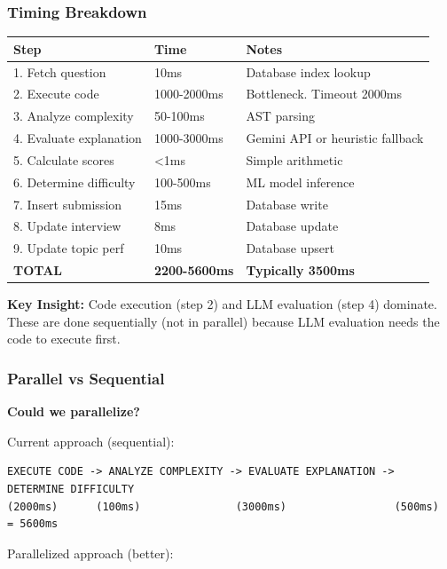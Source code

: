 \documentclass[12pt,a4paper,oneside]{article}
\begin{document}
\subsubsection{Timing Breakdown}

\begin{table}[H]
\centering
\begin{tabular}{|p{2.5cm}|p{2cm}|p{7.5cm}|}
\hline
\textbf{Step} & \textbf{Time} & \textbf{Notes} \\
\hline
1. Fetch question & 10ms & Database index lookup \\
\hline
2. Execute code & 1000-2000ms & Bottleneck. Timeout 2000ms \\
\hline
3. Analyze complexity & 50-100ms & AST parsing \\
\hline
4. Evaluate explanation & 1000-3000ms & Gemini API or heuristic fallback \\
\hline
5. Calculate scores & <1ms & Simple arithmetic \\
\hline
6. Determine difficulty & 100-500ms & ML model inference \\
\hline
7. Insert submission & 15ms & Database write \\
\hline
8. Update interview & 8ms & Database update \\
\hline
9. Update topic perf & 10ms & Database upsert \\
\hline
\textbf{TOTAL} & \textbf{2200-5600ms} & \textbf{Typically 3500ms} \\
\hline
\end{tabular}
\end{table}

\textbf{Key Insight:} Code execution (step 2) and LLM evaluation (step 4) dominate. These are done sequentially (not in parallel) because LLM evaluation needs the code to execute first.

\subsubsection{Parallel vs Sequential}

\textbf{Could we parallelize?}

Current approach (sequential):

\begin{lstlisting}
EXECUTE CODE -> ANALYZE COMPLEXITY -> EVALUATE EXPLANATION -> DETERMINE DIFFICULTY
(2000ms)      (100ms)               (3000ms)                 (500ms)
= 5600ms
\end{lstlisting}

Parallelized approach (better):
\end{document}
